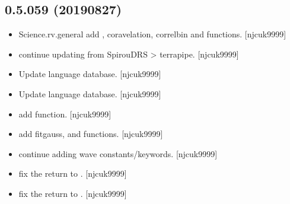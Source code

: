\documentclass[a4paper,10pt,english]{report}
\begin{document}
\subsection{0.5.059 (2019\sphinxhyphen{}08\sphinxhyphen{}27)}
\label{\detokenize{misc/changelog:id103}}\begin{itemize}
\item {} 
Science.rv.general \sphinxhyphen{} add , coravelation, 
 correlbin and  functions. {[}njcuk9999{]}

\item {} 
 \sphinxhyphen{} continue updating from SpirouDRS \textendash{}\textgreater{} terrapipe.
{[}njcuk9999{]}

\item {} 
Update language database. {[}njcuk9999{]}

\item {} 
Update language database. {[}njcuk9999{]}

\item {} 
 \sphinxhyphen{} add  function. {[}njcuk9999{]}

\item {} 
 \sphinxhyphen{} add fitgauss,  and  functions. {[}njcuk9999{]}

\item {} 
 \sphinxhyphen{} continue adding wave constants/keywords.
{[}njcuk9999{]}

\item {} 
 \sphinxhyphen{} fix the return to . {[}njcuk9999{]}

\item {} 
 \sphinxhyphen{} fix the return to . {[}njcuk9999{]}

\end{itemize}
\end{document}

